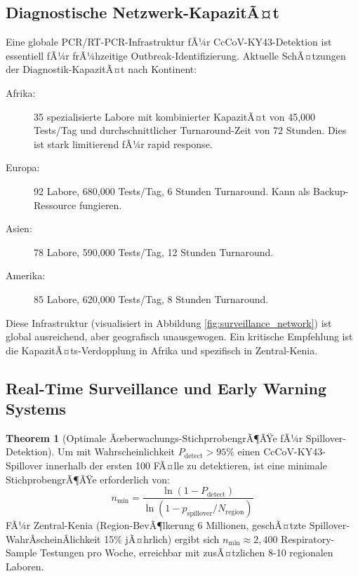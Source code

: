 ﻿\documentclass[11pt,a4paper]{article}
\theoremstyle{definition}
\newtheorem{theorem}{Theorem}[section]
\begin{document}
\subsection{Diagnostische Netzwerk-KapazitÃ¤t}

Eine globale PCR/RT-PCR-Infrastruktur fÃ¼r CcCoV-KY43-Detektion ist essentiell fÃ¼r frÃ¼hzeitige Outbreak-Identifizierung. Aktuelle SchÃ¤tzungen der Diagnostik-KapazitÃ¤t nach Kontinent:

\begin{description}
\item[Afrika:] 35 spezialisierte Labore mit kombinierter KapazitÃ¤t von 45,000 Tests/Tag und durchschnittlicher Turnaround-Zeit von 72 Stunden. Dies ist stark limitierend fÃ¼r rapid response.

\item[Europa:] 92 Labore, 680,000 Tests/Tag, 6 Stunden Turnaround. Kann als Backup-Ressource fungieren.

\item[Asien:] 78 Labore, 590,000 Tests/Tag, 12 Stunden Turnaround.

\item[Amerika:] 85 Labore, 620,000 Tests/Tag, 8 Stunden Turnaround.
\end{description}

Diese Infrastruktur (visualisiert in Abbildung \ref{fig:surveillance_network}) ist global ausreichend, aber geografisch unausgewogen. Ein kritische Empfehlung ist die KapazitÃ¤ts-Verdopplung in Afrika und spezifisch in Zentral-Kenia.

\subsection{Real-Time Surveillance und Early Warning Systems}

\begin{theorem}[Optimale Ãœberwachungs-StichprrobengrÃ¶ÃŸe fÃ¼r Spillover-Detektion]
\label{thm:surveillance_sampling}
Um mit Wahrscheinlichkeit $P_{\text{detect}} > 95\%$ einen CcCoV-KY43-Spillover innerhalb der ersten 100 FÃ¤lle zu detektieren, ist eine minimale StichprobengrÃ¶ÃŸe erforderlich von:
\[
n_{\text{min}} = \frac{\ln(1 - P_{\text{detect}})}{\ln(1 - p_{\text{spillover}}/N_{\text{region}})}
\]
FÃ¼r Zentral-Kenia (Region-BevÃ¶lkerung 6 Millionen, geschÃ¤tzte Spillover-WahrÂ­scheinÂ­lichkeit 15\% jÃ¤hrlich) ergibt sich $n_{\text{min}} \approx 2,400$ Respiratory-Sample Testungen pro Woche, erreichbar mit zusÃ¤tzlichen 8-10 regionalen Laboren.
\end{theorem}
\end{document}

